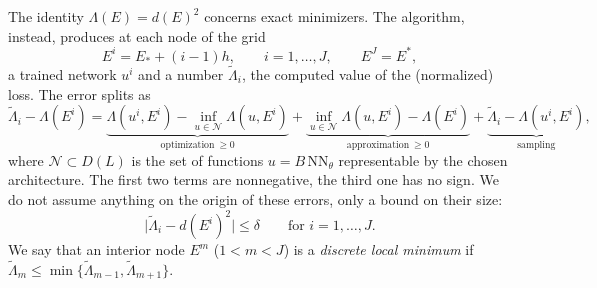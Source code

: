 The identity $\Lambda(E)=d(E)^2$ concerns exact minimizers. The algorithm, instead,
produces at each node of the grid
\[
E^i=E_*+(i-1)h,\qquad i=1,\dots,J,\qquad E^J=E^*,
\]
a trained network $u^i$ and a number $\tilde\Lambda_i$, the computed value of the
(normalized) loss. The error splits as
\begin{equation}\label{error.split}
\tilde\Lambda_i-\Lambda(E^i)=
\underbrace{\Lambda(u^i,E^i)-\inf_{u\in\mathcal N}\Lambda(u,E^i)}_{\text{optimization}\ \ge0}
+\underbrace{\inf_{u\in\mathcal N}\Lambda(u,E^i)-\Lambda(E^i)}_{\text{approximation}\ \ge0}
+\underbrace{\tilde\Lambda_i-\Lambda(u^i,E^i)}_{\text{sampling}},
\end{equation}
where $\mathcal N\subset D(L)$ is the set of functions $u=B\,\mathrm{NN}_\theta$
representable by the chosen architecture. The first two terms are nonnegative, the third
one has no sign. We do not assume anything on the origin of these errors, only a bound on
their size:
\begin{equation}\label{hyp.delta}
\big|\tilde\Lambda_i-d(E^i)^2\big|\le\delta\qquad\text{for } i=1,\dots,J.
\end{equation}
We say that an interior node $E^m$ ($1<m<J$) is a \emph{discrete local minimum} if
$\tilde\Lambda_m\le\min\{\tilde\Lambda_{m-1},\tilde\Lambda_{m+1}\}$.

